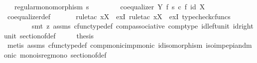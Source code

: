 \begin{isabellebody}
\ \ \ {\isachardoublequoteopen}regular{\isacharunderscore}{\kern0pt}monomorphism\ s{\isachardoublequoteclose}\isanewline
%
\isadelimproof
%
\endisadelimproof
%
\isatagproof
{}\isamarkupfalse%
\ {\isacharminus}{\kern0pt}\ \ \ \isanewline
\ \ \isamarkupfalse%
\ {\isachardoublequoteopen}coequalizer\ Y\ f\ {\isacharparenleft}{\kern0pt}s\ {\isasymcirc}\isactrlsub c\ f{\isacharparenright}{\kern0pt}\ {\isacharparenleft}{\kern0pt}id\ X{\isacharparenright}{\kern0pt}{\isachardoublequoteclose}\isanewline
\ \ \ \ \isamarkupfalse%
\ coequalizer{\isacharunderscore}{\kern0pt}def\ \isanewline
\ \ \ \ \isamarkupfalse%
\ {\isacharparenleft}{\kern0pt}rule{\isacharunderscore}{\kern0pt}tac\ x{\isacharequal}{\kern0pt}{\isachardoublequoteopen}X{\isachardoublequoteclose}\ \ exI{\isacharcomma}{\kern0pt}\ rule{\isacharunderscore}{\kern0pt}tac\ x{\isacharequal}{\kern0pt}{\isachardoublequoteopen}X{\isachardoublequoteclose}\ \ exI{\isacharcomma}{\kern0pt}\ typecheck{\isacharunderscore}{\kern0pt}cfuncs{\isacharcomma}{\kern0pt}\isanewline
\ \ \ \ \ \ \ \ smt\ {\isacharparenleft}{\kern0pt}z{}{\isacharparenright}{\kern0pt}\ assms\ cfunc{\isacharunderscore}{\kern0pt}type{\isacharunderscore}{\kern0pt}def\ comp{\isacharunderscore}{\kern0pt}associative{}\ comp{\isacharunderscore}{\kern0pt}type\ id{\isacharunderscore}{\kern0pt}left{\isacharunderscore}{\kern0pt}unit\ id{\isacharunderscore}{\kern0pt}right{\isacharunderscore}{\kern0pt}unit{}\ section{\isacharunderscore}{\kern0pt}of{\isacharunderscore}{\kern0pt}def{\isacharparenright}{\kern0pt}\isanewline
\ \ \isamarkupfalse%
\ \isamarkupfalse%
\ {\isacharquery}{\kern0pt}thesis\isanewline
\ \ \ \ \isamarkupfalse%
\ {\isacharparenleft}{\kern0pt}metis\ assms{\isacharparenleft}{\kern0pt}{}{\isacharparenright}{\kern0pt}\ cfunc{\isacharunderscore}{\kern0pt}type{\isacharunderscore}{\kern0pt}def\ comp{\isacharunderscore}{\kern0pt}monic{\isacharunderscore}{\kern0pt}imp{\isacharunderscore}{\kern0pt}monic{\isacharprime}{\kern0pt}\ id{\isacharunderscore}{\kern0pt}isomorphism\ iso{\isacharunderscore}{\kern0pt}imp{\isacharunderscore}{\kern0pt}epi{\isacharunderscore}{\kern0pt}and{\isacharunderscore}{\kern0pt}monic\ mono{\isacharunderscore}{\kern0pt}is{\isacharunderscore}{\kern0pt}regmono\ section{\isacharunderscore}{\kern0pt}of{\isacharunderscore}{\kern0pt}def{\isacharparenright}{\kern0pt}\isanewline
{}\isamarkupfalse%
%
\endisatagproof
{\isafoldproof}%
%
\isadelimproof
\isanewline
%
\endisadelimproof
%
\isadelimtheory
\isanewline
%
\endisadelimtheory
%
\isatagtheory
{}\isamarkupfalse%
%
\endisatagtheory
{\isafoldtheory}%
%
\isadelimtheory
%
\endisadelimtheory
%
\end{isabellebody}%
